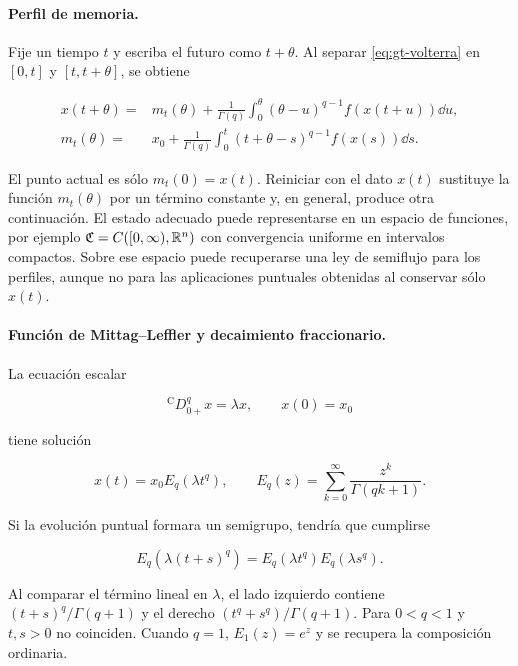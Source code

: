 \paragraph{Perfil de memoria.}
Fije un tiempo $t$ y escriba el futuro como $t+\theta$. Al separar
\eqref{eq:gt-volterra} en $[0,t]$ y $[t,t+\theta]$, se obtiene

\begin{align}
 x(t+\theta)={}&m_t(\theta)
 +\frac{1}{\Gamma(q)}
 \int_0^\theta(\theta-u)^{q-1}f(x(t+u))\dd u,\label{eq:gt-volterra-desplazada}\\
 m_t(\theta)={}&x_0+\frac{1}{\Gamma(q)}
 \int_0^t(t+\theta-s)^{q-1}f(x(s))\dd s.\label{eq:gt-perfil-memoria}
\end{align}

El punto actual es sólo $m_t(0)=x(t)$. Reiniciar con el dato $x(t)$ sustituye la
función $m_t(\theta)$ por un término constante y, en general, produce otra
continuación. El estado adecuado puede representarse en un espacio de funciones, por
ejemplo $\mathfrak C=C([0,\infty),\mathbb{R}^n)$ con convergencia uniforme en intervalos
compactos. Sobre ese espacio puede recuperarse una ley de semiflujo para los perfiles,
aunque no para las aplicaciones puntuales obtenidas al conservar sólo $x(t)$.

\paragraph{Función de Mittag--Leffler y decaimiento fraccionario.}
La ecuación escalar

\begin{equation}
 {}^{\mathrm C}D_{0+}^{q}x=\lambda x,\qquad x(0)=x_0
 \label{eq:gt-caputo-lineal}
\end{equation}

tiene solución

\begin{equation}
 x(t)=x_0E_q(\lambda t^q),\qquad
 E_q(z)=\sum_{k=0}^{\infty}\frac{z^k}{\Gamma(qk+1)}.
 \label{eq:gt-mittag-leffler}
\end{equation}

Si la evolución puntual formara un semigrupo, tendría que cumplirse

\begin{equation}
 E_q(\lambda(t+s)^q)=E_q(\lambda t^q)E_q(\lambda s^q).
 \label{eq:gt-falsa-composicion}
\end{equation}

Al comparar el término lineal en $\lambda$, el lado izquierdo contiene
$(t+s)^q/\Gamma(q+1)$ y el derecho
$(t^q+s^q)/\Gamma(q+1)$. Para $0<q<1$ y $t,s>0$ no coinciden. Cuando $q=1$,
$E_1(z)=e^z$ y se recupera la composición ordinaria.

